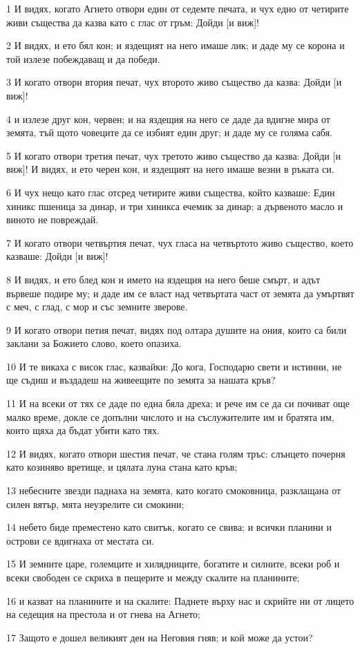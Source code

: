 \par 1 И видях, когато Агнето отвори един от седемте печата, и чух едно от четирите живи същества да казва като с глас от гръм: Дойди [и виж]!
\par 2 И видях, и ето бял кон; и яздещият на него имаше лик; и даде му се корона и той излезе побеждаващ и да победи.
\par 3 И когато отвори втория печат, чух второто живо същество да казва: Дойди [и виж]!
\par 4 и излезе друг кон, червен; и на яздещия на него се даде да вдигне мира от земята, тъй щото човеците да се избият един друг; и даде му се голяма сабя.
\par 5 И когато отвори третия печат, чух третото живо същество да казва: Дойди [и виж]! И видях, и ето черен кон, и яздещият на него имаше везни в ръката си.
\par 6 И чух нещо като глас отсред четирите живи същества, който казваше: Един хиникс пшеница за динар, и три хиникса ечемик за динар; а дървеното масло и виното не повреждай.
\par 7 И когато отвори четвъртия печат, чух гласа на четвъртото живо същество, което казваше: Дойди [и виж]!
\par 8 И видях, и ето блед кон и името на яздещия на него беше смърт, и адът вървеше подире му; и даде им се власт над четвъртата част от земята да умъртвят с меч, с глад, с мор и със земните зверове.
\par 9 И когато отвори петия печат, видях под олтара душите на ония, които са били заклани за Божието слово, което опазиха.
\par 10 И те викаха с висок глас, казвайки: До кога, Господарю свети и истинни, не ще съдиш и въздадеш на живеещите по земята за нашата кръв?
\par 11 И на всеки от тях се даде по една бяла дреха; и рече им се да си почиват още малко време, докле се допълни числото и на съслужителите им и братята им, които щяха да бъдат убити като тях.
\par 12 И видях, когато отвори шестия печат, че стана голям тръс: слънцето почерня като козиняво вретище, и цялата луна стана като кръв;
\par 13 небесните звезди паднаха на земята, като когато смоковница, разклащана от силен вятър, мята неузрелите си смокини;
\par 14 небето биде преместено като свитък, когато се свива; и всички планини и острови се вдигнаха от местата си.
\par 15 И земните царе, големците и хилядниците, богатите и силните, всеки роб и всеки свободен се скриха в пещерите и между скалите на планините;
\par 16 и казват на планините и на скалите: Паднете върху нас и скрийте ни от лицето на седещия на престола и от гнева на Агнето;
\par 17 Защото е дошел великият ден на Неговия гняв; и кой може да устои?

